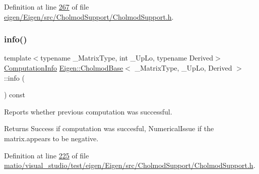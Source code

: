 Definition at line \hyperlink{eigen_2_eigen_2src_2_cholmod_support_2_cholmod_support_8h_source_l00267}{267} of file \hyperlink{eigen_2_eigen_2src_2_cholmod_support_2_cholmod_support_8h_source}{eigen/\+Eigen/src/\+Cholmod\+Support/\+Cholmod\+Support.\+h}.

\mbox{\label{class_eigen_1_1_cholmod_base_ada4cc43c64767d186fcb8997440cc753}} 
\subsubsection{\texorpdfstring{info()}{info()}\hspace{0.1cm}{\footnotesize\ttfamily [1/2]}}
{\footnotesize\ttfamily template$<$typename \+\_\+\+Matrix\+Type, int \+\_\+\+Up\+Lo, typename Derived$>$ \\
\hyperlink{group__enums_ga85fad7b87587764e5cf6b513a9e0ee5e}{Computation\+Info} \hyperlink{class_eigen_1_1_cholmod_base}{Eigen\+::\+Cholmod\+Base}$<$ \+\_\+\+Matrix\+Type, \+\_\+\+Up\+Lo, Derived $>$\+::info (\begin{DoxyParamCaption}{ }\end{DoxyParamCaption}) const\hspace{0.3cm}{\ttfamily [inline]}}



Reports whether previous computation was successful. 

\begin{DoxyReturn}{Returns}
{\ttfamily Success} if computation was succesful, {\ttfamily Numerical\+Issue} if the matrix.\+appears to be negative. 
\end{DoxyReturn}


Definition at line \hyperlink{matio_2visual__studio_2test_2eigen_2_eigen_2src_2_cholmod_support_2_cholmod_support_8h_source_l00225}{225} of file \hyperlink{matio_2visual__studio_2test_2eigen_2_eigen_2src_2_cholmod_support_2_cholmod_support_8h_source}{matio/visual\+\_\+studio/test/eigen/\+Eigen/src/\+Cholmod\+Support/\+Cholmod\+Support.\+h}.

\mbox{\label{class_eigen_1_1_cholmod_base_ada4cc43c64767d186fcb8997440cc753}} 
